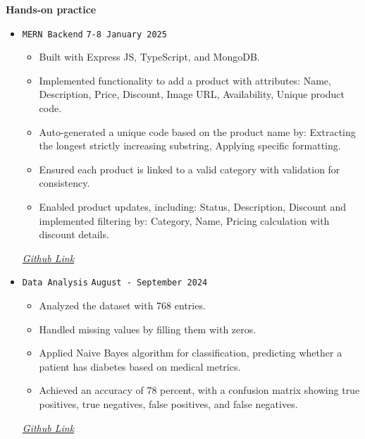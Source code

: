 \documentclass[a4paper,12pt]{article}
\begin{document}
\textbf{Hands-on practice} 
\vspace{0.3cm}

\begin{itemize}

    \item \texttt{MERN Backend} \hfill \texttt{7-8 January 2025}  
    \begin{itemize}
        \item Built with Express JS, TypeScript, and MongoDB.
        \item Implemented functionality to add a product with attributes: Name, Description, Price, Discount, Image URL, Availability, Unique product code.
        \item Auto-generated a unique code based on the product name by: Extracting the longest strictly increasing substring, Applying specific formatting.
        \item Ensured each product is linked to a valid category with validation for consistency.
        \item Enabled product updates, including: Status, Description, Discount and implemented filtering by: Category, Name, Pricing calculation with discount details.
    \end{itemize}
    
    \hfill \href{https://github.com/0Sa-ad0/backend-challenge}{\textit{Github Link}}  
    \vspace{0.3cm}

    \item \texttt{Data Analysis} \hfill \texttt{August - September 2024}  
    \begin{itemize}[label=--]  %
        \item Analyzed the dataset with 768 entries.
        \item Handled missing values by filling them with zeros.
        \item Applied Naive Bayes algorithm for classification, predicting whether a patient has diabetes based on medical metrics.
        \item Achieved an accuracy of 78 percent, with a confusion matrix showing true positives, true negatives, false positives, and false negatives.
    \end{itemize} 

    \hfill \href{https://github.com/0Sa-ad0/Data-mining}{\textit{Github Link}}  
    \vspace{0.3cm}


\end{itemize}
\end{document}
